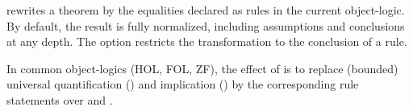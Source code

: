 \begin{isabellebody}
\begin{isamarkuptext}
\begin{descr}
  \item [\hyperlink{attribute.rule-format}{\mbox{\isa{rule{\isacharunderscore}format}}}] rewrites a theorem by the
  equalities declared as \hyperlink{attribute.rulify}{\mbox{}} rules in the current
  object-logic.  By default, the result is fully normalized, including
  assumptions and conclusions at any depth.  The 
  option restricts the transformation to the conclusion of a rule.

  In common object-logics (HOL, FOL, ZF), the effect of \hyperlink{attribute.rule-format}{\mbox{}} is to replace (bounded) universal quantification
  (\isa{{\isachardoublequote}{\isasymforall}{\isachardoublequote}}) and implication (\isa{{\isachardoublequote}{\isasymlongrightarrow}{\isachardoublequote}}) by the corresponding
  rule statements over \isa{{\isachardoublequote}{\isasymAnd}{\isachardoublequote}} and \isa{{\isachardoublequote}{\isasymLongrightarrow}{\isachardoublequote}}.

  \end{descr}%
\end{isamarkuptext}%
\isamarkuptrue%
%
\isadelimtheory
%
\endisadelimtheory
%
\isatagtheory
{}\isamarkupfalse%
%
\endisatagtheory
{\isafoldtheory}%
%
\isadelimtheory
%
\endisadelimtheory
\isanewline
\end{isabellebody}%
